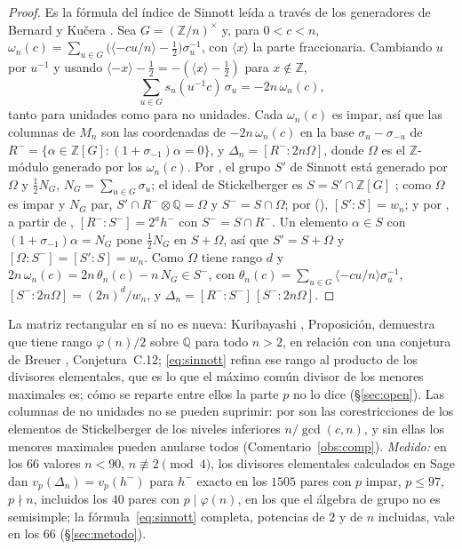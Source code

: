 \documentclass[11pt,a4paper]{article}
\theoremstyle{definition}
\newcommand{\ZZ}{\mathbb{Z}}
\newcommand{\QQ}{\mathbb{Q}}
\begin{document}
\begin{proof}
Es la fórmula del índice de Sinnott \cite{Sin78,Sin80} leída a través de los generadores de Bernard y Kučera \cite{BK24}.
Sea $G=(\ZZ/n)^\times$ y, para $0<c<n$, $\omega_n(c)=\sum_{u\in G}\bigl(\langle-cu/n\rangle-\tfrac12\bigr)\sigma_u^{-1}$, con
$\langle x\rangle$ la parte fraccionaria. Cambiando $u$ por $u^{-1}$ y usando $\langle-x\rangle-\tfrac12=-(\langle
x\rangle-\tfrac12)$ para $x\notin\ZZ$,
\[
\sum_{u\in G}s_n(u^{-1}c)\,\sigma_u=-2n\,\omega_n(c),
\]
tanto para unidades como para no unidades. Cada $\omega_n(c)$ es impar, así que las columnas de $M_n$ son las
coordenadas de $-2n\,\omega_n(c)$ en la base $\sigma_u-\sigma_{-u}$ de $R^-=\{\alpha\in\ZZ[G]:(1+\sigma_{-1})\alpha=0\}$,
y $\Delta_n=[R^-:2n\Omega]$, donde $\Omega$ es el $\ZZ$-módulo generado por los $\omega_n(c)$. Por
\cite[Lema~1.2 y (7)]{BK24}, el grupo $S'$ de Sinnott está generado por $\Omega$ y $\tfrac12N_G$, $N_G=\sum_{u\in G}\sigma_u$; el ideal de
Stickelberger es $S=S'\cap\ZZ[G]$ \cite[\S1]{BK24}; como $\Omega$ es impar y $N_G$ par, $S'\cap R^-\otimes\QQ=\Omega$
y $S^-=S\cap\Omega$; por \cite[Lema~1.1]{BK24} (\cite[Prop.~2.1]{Sin80}), $[S':S]=w_n$; y por
\cite[(26)]{BK24}, a partir de \cite{Sin78}, $[R^-:S^-]=2^ah^-$ con $S^-=S\cap R^-$. Un elemento $\alpha\in S$ con
$(1+\sigma_{-1})\alpha=N_G$ \cite[Prop.~3.1]{BK24} pone $\tfrac12N_G$ en $S+\Omega$, así que $S'=S+\Omega$ y
$[\Omega:S^-]=[S':S]=w_n$. Como $\Omega$ tiene rango $d$ y
$2n\,\omega_n(c)=2n\,\theta_n(c)-n\,N_G\in S^-$, con $\theta_n(c)=\sum_{u\in G}\langle-cu/n\rangle\sigma_u^{-1}$,
$[S^-:2n\Omega]=(2n)^d/w_n$, y $\Delta_n=[R^-:S^-]\,[S^-:2n\Omega]$.
\end{proof}

\noindent La matriz rectangular en sí no es nueva: Kuribayashi \cite{Kur08}, Proposición, demuestra que tiene rango
$\varphi(n)/2$ sobre $\QQ$ para todo $n>2$, en relación con una conjetura de Breuer \cite{Bre00}, Conjetura~C.12;
\eqref{eq:sinnott} refina ese rango al producto de los divisores elementales, que es lo que el máximo común divisor
de los menores maximales es; cómo se reparte entre ellos la parte $p$ no lo dice (\S\ref{sec:open}). Las columnas de no unidades no se pueden suprimir: por
\cite[(6)]{BK24} son las corestricciones de los
elementos de Stickelberger de los niveles inferiores $n/\gcd(c,n)$, y sin ellas los menores maximales pueden anularse
todos (Comentario~\ref{obs:comp}). \emph{Medido:} en los $66$ valores $n<90$, $n\not\equiv2\pmod4$, los divisores
elementales calculados en Sage dan $v_p(\Delta_n)=v_p(h^-)$ para $h^-$ exacto en los $1505$ pares con $p$ impar,
$p\le97$, $p\nmid n$, incluidos los $40$ pares con $p\mid\varphi(n)$, en los que el álgebra de grupo no es semisimple;
la fórmula~\eqref{eq:sinnott} completa, potencias de $2$ y de $n$ incluidas, vale en los $66$ (\S\ref{sec:metodo}).
\end{document}
